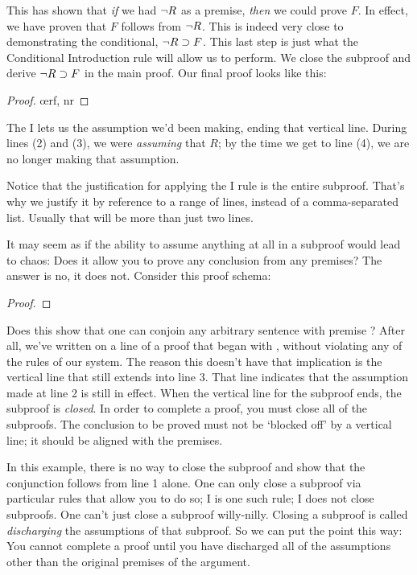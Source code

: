 This has shown that \emph{if} we had $\neg R$ as a premise, \emph{then} we could prove $F$. In effect, we have proven that $F$ follows from $\neg R$. This is indeed very close to demonstrating the conditional, $\neg R \supset F$. This last step is just what the Conditional Introduction rule will allow us to perform. We close the subproof and derive $\neg R \supset F$ in the main proof. Our final proof looks like this:

\begin{proof}
	\open
		\oe{rf, nr}
	\close
\end{proof}

The {\eif}I lets us  the assumption we'd been making, ending that vertical line. During lines (2) and (3), we were \emph{assuming} that \enot $R$; by the time we get to line (4), we are no longer making that assumption.

Notice that the justification for applying the {\eif}I rule is the entire subproof. That's why we justify it by reference to a range of lines, instead of a comma-separated list. Usually that will be more than just two lines.

It may seem as if the ability to assume anything at all in a subproof would lead to chaos: Does it allow you to prove any conclusion from any premises? The answer is no, it does not. Consider this proof schema:

\begin{proof}
	\metaA{}
	\open
		\metaB{}
		 
	\close
\end{proof}

Does this show that one can conjoin any arbitrary sentence \metaB{} with premise \metaA{}? After all, we've written \metaB{}\eand\metaA{} on a line of a proof that began with \metaA{}, without violating any of the rules of our system. The reason this doesn't have that implication is the vertical line that still extends into line 3. That line indicates that the assumption made at line 2 is still in effect. When the vertical line for the subproof ends, the subproof is \emph{closed}. In order to complete a proof, you must close all of the subproofs. The conclusion to be proved must not be `blocked off' by a vertical line; it should be aligned with the premises.

In this example, there is no way to close the subproof and show that the conjunction follows from line 1 alone. One can only close a subproof via particular rules that allow you to do so; {\eif}I is one such rule; {\eand}I does not close subproofs. One can't just close a subproof willy-nilly. Closing a subproof is called \emph{discharging} the assumptions of that subproof. So we can put the point this way: You cannot complete a proof until you have discharged all of the assumptions other than the original premises of the argument.

